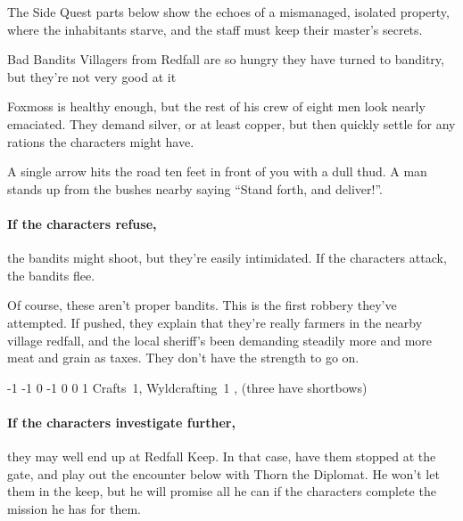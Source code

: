 The Side Quest parts below show the echoes of a mismanaged, isolated property, where the inhabitants starve, and the staff must keep their master's secrets.

{\N Bad Bandits}%
{Villagers from Redfall are so hungry they have turned to banditry, but they're not very good at it}%

Foxmoss is healthy enough, but the rest of his crew of eight men look nearly emaciated.
They demand silver, or at least copper, but then quickly settle for any rations the characters might have.

\begin{boxtext}

  A single arrow hits the road ten feet in front of you with a dull thud.
  A man stands up from the bushes nearby saying ``Stand forth, and deliver!''.

\end{boxtext}

\paragraph{If the characters refuse,}
the bandits might shoot, but they're easily intimidated.  If the characters attack, the bandits flee.

Of course, these aren't proper bandits.
This is the first robbery they've attempted.
If pushed, they explain that they're really farmers in the nearby village \gls{redfall}, and the local sheriff's been demanding steadily more and more meat and grain as taxes.
They don't have the strength to go on.


  {-1}%
  {-1}%
  {{0}%
  {-1}%
  {0}}%
  {0}%
  {1}%
  {Crafts~1, Wyldcrafting~1}%
  {\Dagger, (three have shortbows)}%
  {}

\paragraph{If the characters investigate further,}
they may well end up at Redfall Keep.
In that case, have them stopped at the gate, and play out the encounter below with Thorn the Diplomat.
He won't let them in the keep, but he will promise all he can if the characters complete the mission he has for them.

